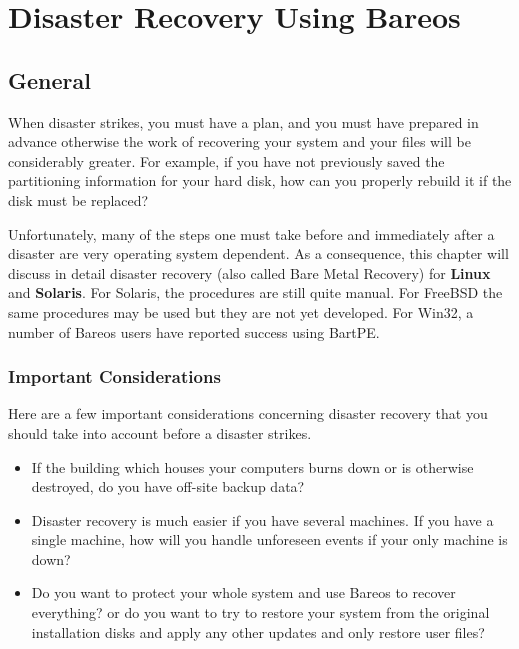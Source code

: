 
\chapter{Disaster Recovery Using Bareos}
\label{RescueChapter}

\section{General}

When disaster strikes, you must have a plan, and you must have prepared in
advance otherwise the work of recovering your system and your files will be
considerably greater.  For example, if you have not previously saved the
partitioning information for your hard disk, how can you properly rebuild
it if the disk must be replaced?

Unfortunately, many of the steps one must take before and immediately after
a disaster are very operating system dependent.  As a consequence, this
chapter will discuss in detail disaster recovery (also called Bare Metal
Recovery) for {\bf Linux} and {\bf Solaris}.  For Solaris, the procedures
are still quite manual.  For FreeBSD the same procedures may be used but
they are not yet developed.  For Win32, a number of Bareos users have
reported success using BartPE.


\subsection{Important Considerations}
\label{considerations1}

Here are a few important considerations concerning disaster recovery that
you should take into account before a disaster strikes.

\begin{itemize}
\item If the building which houses your computers burns down or is otherwise
   destroyed, do you have off-site backup data?
\item Disaster recovery is much easier if you have several machines. If  you
   have a single machine, how will you handle unforeseen events  if your only
   machine is down?
\item Do you want to protect your whole system and use Bareos to  recover
   everything? or do you want to try to restore your system from  the original
   installation disks and apply any other updates and  only restore user files?
\end{itemize}

